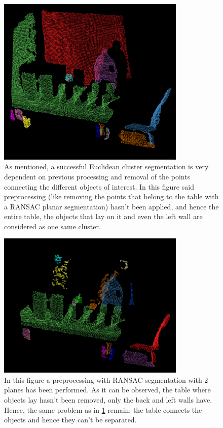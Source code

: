 \documentclass[../main.tex]{subfiles}
\begin{document}
\begin{figure}[htbp]
    \centering
    \includegraphics[width=0.8\textwidth]{images/euclidean_cluster_pre0planes.png}
    \caption{As mentioned, a successful Euclidean cluster segmentation is very dependent on previous processing and removal of the points connecting the different objects of interest. In this figure said preprocessing (like removing the points that belong to the table with a RANSAC planar segmentation) hasn't been applied, and hence the entire table, the objects that lay on it and even the left wall are considered as one same cluster.}
    \label{fig:euclidean_cluster_pre0planes}
\end{figure}

\begin{figure}[htbp]
    \centering
    \includegraphics[width=0.8\textwidth]{images/euclidean_cluster_pre2planes.png}
    \caption{In this figure a preprocessing with RANSAC segmentation with 2 planes has been performed. As it can be observed, the table where objects lay hasn't been removed, only the back and left walls have. Hence, the same problem as in \ref{fig:euclidean_cluster_pre0planes} remain: the table connects the objects and hence they can't be separated.}
    \label{fig:euclidean_cluster_pre2planes}
\end{figure}
\end{document}
